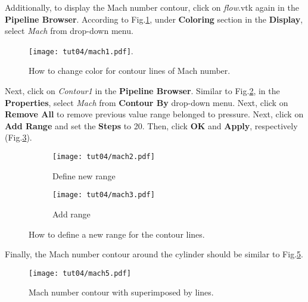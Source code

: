 Additionally, to display the Mach number contour, click on \textit{flow}.vtk again in the \textbf{Pipeline Browser}. According to Fig.\ref{fig4:mach1_4}, under \textbf{Coloring} section in the \textbf{Display}, select \textit{Mach} from drop-down menu.
\begin{figure}[htbp]
    \centering
    \texttt{[image: tut04/mach1.pdf]}.
    \caption{How to change color for contour lines of Mach number.}
    \label{fig4:mach1_4}
\end{figure}
Next, click on \textit{Contour1} in the \textbf{Pipeline Browser}. Similar to Fig.\ref{fig4:mach2_4 a}, in the \textbf{Properties}, select \textit{Mach} from \textbf{Contour By} drop-down menu. Next, click on \textbf{Remove All} to remove previous value range belonged to pressure. Next, click on \textbf{Add Range} and set the \textbf{Steps} to 20. Then, click \textbf{OK} and \textbf{Apply}, respectively (Fig.\ref{fig4:mach2_4 b}).
\begin{figure}[htbp]
    \centering
    \begin{subfigure}[b]{0.4\textwidth}
        \centering
        \texttt{[image: tut04/mach2.pdf]}
        \caption{Define new range}
        \label{fig4:mach2_4 a}
    \end{subfigure}
    \hfill
    \begin{subfigure}[b]{.4\textwidth}
        \centering
        \texttt{[image: tut04/mach3.pdf]}
        \caption{Add range}
        \label{fig4:mach2_4 b}
    \end{subfigure}     
    \caption{How to define a new range for the contour lines.}
    \label{fig4:mach2_4}
\end{figure}
Finally, the Mach number contour around the cylinder should be similar to Fig.\ref{fig4:mach5_4}.
\begin{figure}[htbp]
    \centering
    \texttt{[image: tut04/mach5.pdf]}
    \caption{Mach number contour with superimposed by lines.}
    \label{fig4:mach5_4}
\end{figure}
